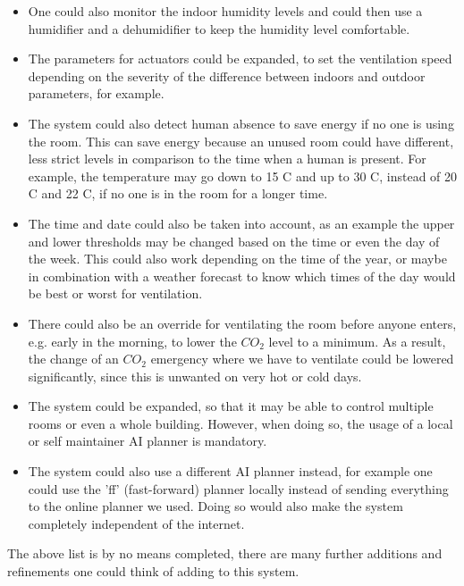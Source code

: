 \begin{itemize}
    \item One could also monitor the indoor humidity levels and could then use a humidifier and a dehumidifier to keep the humidity level comfortable.

    \item The parameters for actuators could be expanded, to set the ventilation speed depending on the severity of the difference between indoors and outdoor parameters, for example.

    \item The system could also detect human absence to save energy if no one is using the room.
    This can save energy because an unused room could have different, less strict levels in comparison to the time when a human is present.
    For example, the temperature may go down to 15 \textdegree C and up to 30 \textdegree C, instead of 20 \textdegree C and 22 \textdegree C, if no one is in the room for a longer time.

    \item The time and date could also be taken into account, as an example the upper and lower thresholds may be changed based on the time or even the day of the week.
    This could also work depending on the time of the year, or maybe in combination with a weather forecast to know which times of the day would be best or worst for ventilation.

    \item There could also be an override for ventilating the room before anyone enters, e.g. early in the morning, to lower the $CO_2$ level to a minimum.
    As a result, the change of an $CO_2$ emergency where we have to ventilate could be lowered significantly, since this is unwanted on very hot or cold days.

    \item The system could be expanded, so that it may be able to control multiple rooms or even a whole building.
    However, when doing so, the usage of a local or self maintainer AI planner is mandatory.

    \item The system could also use a different AI planner instead, for example one could use the 'ff' (fast-forward) planner locally instead of sending everything to the online planner we used.
    Doing so would also make the system completely independent of the internet.
\end{itemize}

The above list is by no means completed, there are many further additions and refinements one could think of adding to this system.